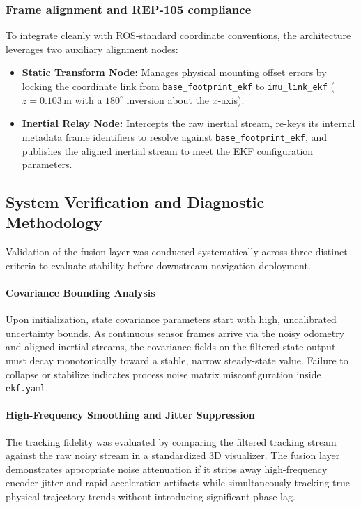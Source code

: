 \subsubsection{Frame alignment and REP-105 compliance}

To integrate cleanly with ROS-standard coordinate conventions, the architecture leverages two auxiliary alignment nodes:
\begin{itemize}
\item \textbf{Static Transform Node:} Manages physical mounting offset errors by locking the coordinate link from \texttt{base\_footprint\_ekf} to \texttt{imu\_link\_ekf} ($z = 0.103$\,m with a $180^\circ$ inversion about the $x$-axis).
\item \textbf{Inertial Relay Node:} Intercepts the raw inertial stream, re-keys its internal metadata frame identifiers to resolve against \texttt{base\_footprint\_ekf}, and publishes the aligned inertial stream to meet the EKF configuration parameters.
\end{itemize}

\subsection{System Verification and Diagnostic Methodology}
\label{subsec:verification}

Validation of the fusion layer was conducted systematically across three distinct criteria to evaluate stability before downstream navigation deployment.

\paragraph{Covariance Bounding Analysis}
Upon initialization, state covariance parameters start with high, uncalibrated uncertainty bounds. As continuous sensor frames arrive via the noisy odometry and aligned inertial streams, the covariance fields on the filtered state output must decay monotonically toward a stable, narrow steady-state value. Failure to collapse or stabilize indicates process noise matrix misconfiguration inside \texttt{ekf.yaml}.

\paragraph{High-Frequency Smoothing and Jitter Suppression}
The tracking fidelity was evaluated by comparing the filtered tracking stream against the raw noisy stream in a standardized 3D visualizer. The fusion layer demonstrates appropriate noise attenuation if it strips away high-frequency encoder jitter and rapid acceleration artifacts while simultaneously tracking true physical trajectory trends without introducing significant phase lag.

